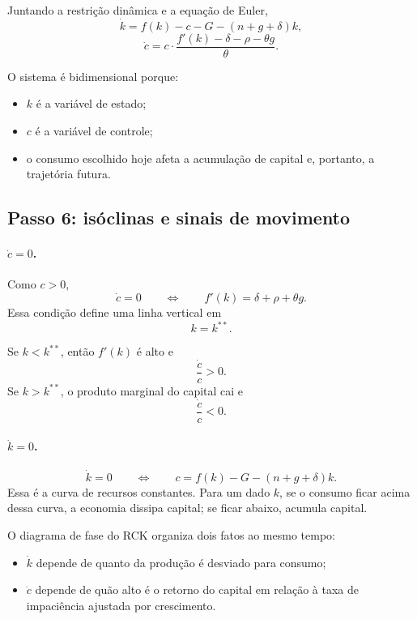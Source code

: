 \documentclass[11pt,a4paper]{article}
\begin{document}
Juntando a restri\c{c}\~ao din\^amica e a equa\c{c}\~ao de Euler,
\[
\dot k=f(k)-c-G-(n+g+\delta)k,
\]
\[
\dot c=
c\cdot
\frac{f'(k)-\delta-\rho-\theta g}{\theta}.
\]

O sistema \'e bidimensional porque:
\begin{itemize}
  \item \(k\) \'e a vari\'avel de estado;
  \item \(c\) \'e a vari\'avel de controle;
  \item o consumo escolhido hoje afeta a acumula\c{c}\~ao de capital e, portanto,
  a trajet\'oria futura.
\end{itemize}

\subsection{Passo 6: is\'oclinas e sinais de movimento}

\paragraph{\(\dot c=0\).}
Como \(c>0\),
\[
\dot c=0
\qquad \Longleftrightarrow \qquad
f'(k)=\delta+\rho+\theta g.
\]
Essa condi\c{c}\~ao define uma linha vertical em
\[
k=k^{\ast\ast}.
\]

Se \(k<k^{\ast\ast}\), ent\~ao \(f'(k)\) \'e alto e
\[
\frac{\dot c}{c}>0.
\]
Se \(k>k^{\ast\ast}\), o produto marginal do capital cai e
\[
\frac{\dot c}{c}<0.
\]

\paragraph{\(\dot k=0\).}
\[
\dot k=0
\qquad \Longleftrightarrow \qquad
c=f(k)-G-(n+g+\delta)k.
\]
Essa \'e a curva de recursos constantes. Para um dado \(k\), se o consumo ficar
acima dessa curva, a economia dissipa capital; se ficar abaixo, acumula capital.

\begin{intuicao}
O diagrama de fase do RCK organiza dois fatos ao mesmo tempo:
\begin{itemize}
  \item \(\dot{k}\) depende de quanto da produ\c{c}\~ao \'e desviado para consumo;
  \item \(\dot{c}\) depende de qu\~ao alto \'e o retorno do capital em rela\c{c}\~ao
  \`a taxa de impaci\^encia ajustada por crescimento.
\end{itemize}
\end{intuicao}
\end{document}

